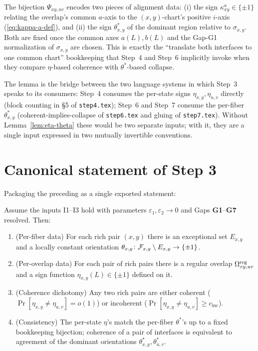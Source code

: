 \begin{remark}\label{rem:eta-theta-bookkeeping}
The bijection $\Psi_{xy,uv}$ encodes two pieces of alignment data:
(i) the sign $\kappa^a_{xy}\in\{\pm 1\}$ relating the overlap's common
$a$-axis to the $(x,y)$-chart's positive $i$-axis
(\eqref{eq:kappa-a-def}), and (ii) the sign $\theta^\ast_{x,y}$ of the
dominant region relative to $\sigma_{x,y}$. Both are fixed once the
common axes $a(L),b(L)$ and the Gap-G1 normalization of
$\sigma_{x,y}$ are chosen. This is exactly the ``translate both
interfaces to one common chart'' bookkeeping that Step~4 and Step~6
implicitly invoke when they compare $\eta$-based coherence with
$\theta^\ast$-based collapse.
\end{remark}

\begin{remark}\label{rem:g7-load-bearing}
The lemma is the bridge between the two language systems in which
Step~3 speaks to its consumers: Step~4 consumes the per-state signs
$\eta_{x,y},\eta_{u,v}$ directly (block counting in \S5 of
\texttt{step4.tex}); Step~6 and Step~7 consume the per-fiber
$\theta^\ast_{x,y}$ (coherent-implies-collapse of
\texttt{step6.tex} and gluing of \texttt{step7.tex}). Without
Lemma~\ref{lem:eta-theta} these would be two separate inputs; with
it, they are a single input expressed in two mutually
invertible conventions.
\end{remark}

\section{Canonical statement of Step 3}\label{sec:canonical-statement}

Packaging the preceding as a single exported statement:

\begin{theorem}[Step~3]\label{thm:step3}
Assume the inputs \textsc{I1}--\textsc{I3} hold with parameters
$\varepsilon_1,\varepsilon_2\to 0$ and Gaps \textbf{G1}--\textbf{G7} resolved.
Then:
\begin{enumerate}[nosep,leftmargin=2em]
  \item (Per-fiber data) For each rich pair $(x,y)$ there is an exceptional set
  $E_{x,y}$ and a locally constant orientation
  $\theta_{x,y}\colon \mathcal{F}_{x,y}\setminus E_{x,y}\to\{\pm 1\}$.
  \item (Per-overlap data) For each pair of rich pairs there is a regular
  overlap $\Omega^{\mathrm{reg}}_{xy,uv}$ and a sign function $\eta_{x,y}(L)\in\{\pm 1\}$
  defined on it.
  \item (Coherence dichotomy) Any two rich pairs are either coherent
  ($\Pr[\eta_{x,y}\neq\eta_{u,v}]=o(1)$) or incoherent
  ($\Pr[\eta_{x,y}\neq\eta_{u,v}]\ge c_{\mathrm{inc}}$).
  \item (Consistency) The per-state $\eta$'s match the per-fiber
  $\theta^\ast$'s up to a fixed bookkeeping bijection; coherence of a pair of
  interfaces is equivalent to agreement of the dominant orientations
  $\theta^\ast_{x,y},\theta^\ast_{u,v}$.
\end{enumerate}
\end{theorem}

